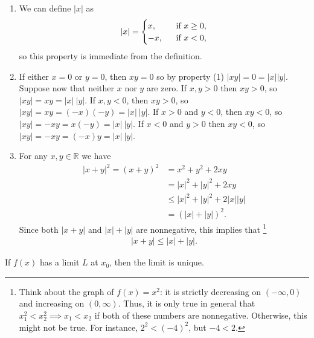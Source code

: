 \documentclass[12pt,letterpaper,reqno]{article}
\numberwithin{equation}{section}
\newcommand{\R}{\ensuremath{\mathbb R}}
\begin{document}
{\begin{pf}
\begin{enumerate}[(1)]
	\item We can define $|x|$ as 
	\begin{align*}
		|x|=\begin{cases}
			x, \hspace{0.25cm} &\text{if } x \geq 0, \\
			-x, \hspace{0.25cm} &\text{if } x < 0, \\
		\end{cases}
	\end{align*}
	so this property is immediate from the definition.
	\item If either $x=0$ or $y=0$, then $xy=0$ so by property (1) $|xy|=0=|x||y|$. Suppose now that neither $x$ nor $y$ are zero. If $x,y>0$ then $xy>0$, so  $|xy|=xy=|x| \ |y|$. If $x,y<0$, then $xy>0$, so $|xy|=xy=(-x)(-y)=|x|\ |y|$. If $x>0$ and $y<0$, then $xy<0$, so $|xy|=-xy=x(-y)=|x| \ |y|$. If $x<0$ and $y>0$ then $xy<0$, so $|xy|=-xy=(-x)y=|x| \ |y|$.
	\item For any $x,y \in \R$ we have
\begin{align*}
	|x+y|^2=(x+y)^2&=x^2+y^2+2xy \\
	&=|x|^2+|y|^2+2xy \\
	&\leq |x|^2+|y|^2+2|x||y| \\
	&=(|x|+|y|)^2.
\end{align*}	
Since both $|x+y|$ and $|x|+|y|$ are nonnegative, this implies that \footnote{Think about the graph of $f(x)=x^2$: it is strictly decreasing on $(-\infty,0)$ and increasing on $(0,\infty)$. Thus, it is only true in general that $x_1^2 < x_2^2 \implies x_1<x_2$ if both of these numbers are nonnegative. Otherwise, this might not be true. For instance, $2^2<(-4)^2$, but $-4<2$.}
\begin{align*}
	|x+y| \leq |x|+|y|.
\end{align*}
\end{enumerate}
\end{pf}

\begin{thm}\label{thm:uniqueness_of_limits}
	If $f(x)$ has a limit $L$ at $x_0$, then the limit is unique.
\end{thm}

}
\end{document}
